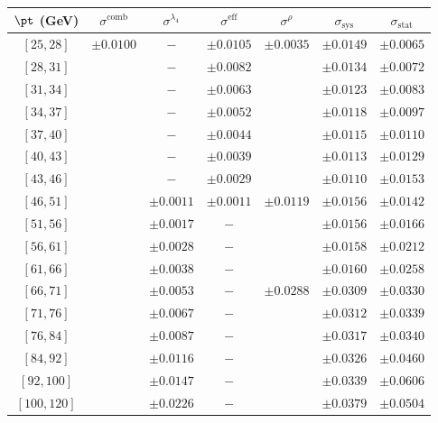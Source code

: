 \begin{tabular}{c||c|c|c|c||c|c}
$\pt$ (GeV) & $\sigma^{\text{comb}}$ & $\sigma^{\lambda_4}$ & $\sigma^{\text{eff}}$ & $\sigma^\rho$ & $\sigma_{\text{sys}}$ & $\sigma_{\text{stat}}$ \\
\hline
$[25, 28]$ & \multirow{17}{*}{$\pm0.0100$} & $-$ & $\pm0.0105$ & \multirow{7}{*}{$\pm0.0035$} & $\pm0.0149$ & $\pm0.0065$\\
$[28, 31]$ &  & $-$ & $\pm0.0082$ &  & $\pm0.0134$ & $\pm0.0072$\\
$[31, 34]$ &  & $-$ & $\pm0.0063$ &  & $\pm0.0123$ & $\pm0.0083$\\
$[34, 37]$ &  & $-$ & $\pm0.0052$ &  & $\pm0.0118$ & $\pm0.0097$\\
$[37, 40]$ &  & $-$ & $\pm0.0044$ &  & $\pm0.0115$ & $\pm0.0110$\\
$[40, 43]$ &  & $-$ & $\pm0.0039$ &  & $\pm0.0113$ & $\pm0.0129$\\
$[43, 46]$ &  & $-$ & $\pm0.0029$ &  & $\pm0.0110$ & $\pm0.0153$\\\cline{5-5}
$[46, 51]$ &  & $\pm0.0011$ & $\pm0.0011$ & \multirow{4}{*}{$\pm0.0119$} & $\pm0.0156$ & $\pm0.0142$\\
$[51, 56]$ &  & $\pm0.0017$ & $-$ &  & $\pm0.0156$ & $\pm0.0166$\\
$[56, 61]$ &  & $\pm0.0028$ & $-$ &  & $\pm0.0158$ & $\pm0.0212$\\
$[61, 66]$ &  & $\pm0.0038$ & $-$ &  & $\pm0.0160$ & $\pm0.0258$\\\cline{5-5}
$[66, 71]$ &  & $\pm0.0053$ & $-$ & \multirow{6}{*}{$\pm0.0288$} & $\pm0.0309$ & $\pm0.0330$\\
$[71, 76]$ &  & $\pm0.0067$ & $-$ &  & $\pm0.0312$ & $\pm0.0339$\\
$[76, 84]$ &  & $\pm0.0087$ & $-$ &  & $\pm0.0317$ & $\pm0.0340$\\
$[84, 92]$ &  & $\pm0.0116$ & $-$ &  & $\pm0.0326$ & $\pm0.0460$\\
$[92, 100]$ &  & $\pm0.0147$ & $-$ &  & $\pm0.0339$ & $\pm0.0606$\\
$[100, 120]$ &  & $\pm0.0226$ & $-$ &  & $\pm0.0379$ & $\pm0.0504$\\
\end{tabular}
